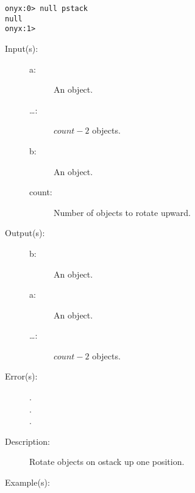 \begin{description}
\begin{description}
\begin{verbatim}
onyx:0> null pstack
null
onyx:1>
		\end{verbatim}
	\end{description}
\label{systemdict:nup}
\item[{\onyxop{a \dots b count}{nup}{b a \dots}}: ]
	\begin{description}\item[]
	\item[Input(s): ]
		\begin{description}\item[]
		\item[a: ]
			An object.
		\item[\dots: ]
			$count - 2$ objects.
		\item[b: ]
			An object.
		\item[count: ]
			Number of objects to rotate upward.
		\end{description}
	\item[Output(s): ]
		\begin{description}\item[]
		\item[b: ]
			An object.
		\item[a: ]
			An object.
		\item[\dots: ]
			$count - 2$ objects.
		\end{description}
	\item[Error(s): ]
		\begin{description}\item[]
		\item[.]
		\item[.]
		\item[.]
		\end{description}
	\item[Description: ]
		Rotate  objects on ostack up one position.
	\item[Example(s): ]\begin{verbatim}


\end{verbatim}
\end{description}
\end{description}
